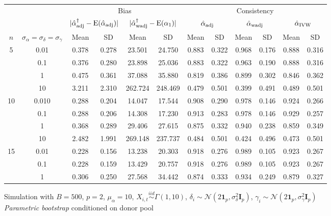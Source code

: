 \documentclass[11pt]{article}
\newcommand{\simiid}{\stackrel{iid}{\sim}} %
\def\normal#1#2{\mathcal{N}(#1,#2)} %
\def\E#1{\mathrm{E}(#1)} %
\theoremstyle{definition}
\begin{document}
\begin{sidewaysfigure}
\centering
\caption{Simulation  with $B = 500$, $p = 2$, $\mu_{\alpha}=10$, $X_{i,t} \simiid \Gamma(1,10)$, $\delta_i \sim \normal{2\mathbf{1}_p}{\sigma^2_{\delta}\mathbf{I}_p}$, $\gamma_i \sim \normal{2\mathbf{1}_p}{\sigma^2_{\gamma}\mathbf{I}_p}$ \\ \emph{Parametric bootstrap} conditioned on donor pool}
\begin{tabular}{cccccc|cccccc}
  && \multicolumn{4}{c|}{Bias}  & \multicolumn{6}{c}{Consistency}  \\ 
   & & \multicolumn{2}{c}{$|\hat{\alpha}_{\rm adj}^{\dagger}-\E{\hat{\alpha}_{\rm adj}}|$} & \multicolumn{2}{c|}{$|\hat{\alpha}_{\rm wadj}^{\dagger}-\E{\alpha_1}|$} & \multicolumn{2}{c}{$\hat{\alpha}_{\rm adj}$}  & \multicolumn{2}{c}{$\hat{\alpha}_{\rm wadj}$}  & \multicolumn{2}{c}{$\hat{\alpha}_{\rm IVW}$}  \\ 
  $n$   & $\sigma_{\alpha} = \sigma_{\delta}=\sigma_{\gamma}$  & Mean & SD & Mean & SD & Mean & SD & Mean & SD & Mean & SD\\[.3cm]  
  \hline
\multirow{4}{*}{5} & 0.01  & 0.378 & 0.278 & 23.501 & 24.750 & 0.883 & 0.322 & 0.968 & 0.176 & 0.888 & 0.316 \\ 
  & 0.1 & 0.376 & 0.280 & 23.898 & 25.036 & 0.883 & 0.322 & 0.963 & 0.190 & 0.888 & 0.316 \\ 
  & 1 & 0.475 & 0.361 & 37.088 & 35.880 & 0.819 & 0.386 & 0.899 & 0.302 & 0.846 & 0.362 \\ 
  & 10  & 3.211 & 2.310 & 262.724 & 248.469 & 0.479 & 0.501 & 0.399 & 0.491 & 0.489 & 0.501 \\[.3cm]  
\multirow{4}{*}{10}  & 0.010  & 0.288 & 0.204 & 14.047 & 17.544 & 0.908 & 0.290 & 0.978 & 0.146 & 0.924 & 0.266 \\ 
 & 0.1  & 0.288 & 0.206 & 14.308 & 17.230 & 0.913 & 0.283 & 0.978 & 0.146 & 0.929 & 0.257 \\ 
   & 1  & 0.368 & 0.289 & 29.406 & 27.615 & 0.875 & 0.332 & 0.940 & 0.238 & 0.859 & 0.349 \\ 
   & 10  & 2.482 & 1.991 & 269.148 & 237.737 & 0.484 & 0.501 & 0.424 & 0.496 & 0.473 & 0.501 \\[.3cm]  
 \multirow{4}{*}{15} & 0.01   & 0.228 & 0.156 & 13.238 & 20.303 & 0.918 & 0.276 & 0.989 & 0.105 & 0.923 & 0.267 \\ 
 &0.1  & 0.228 & 0.159 & 13.429 & 20.757 & 0.918 & 0.276 & 0.989 & 0.105 & 0.923 & 0.267 \\ 
   & 1 & 0.306 & 0.250 & 27.568 & 34.442 & 0.874 & 0.333 & 0.934 & 0.249 & 0.879 & 0.327 \\ 

\end{tabular}
\end{sidewaysfigure}
\end{document}
